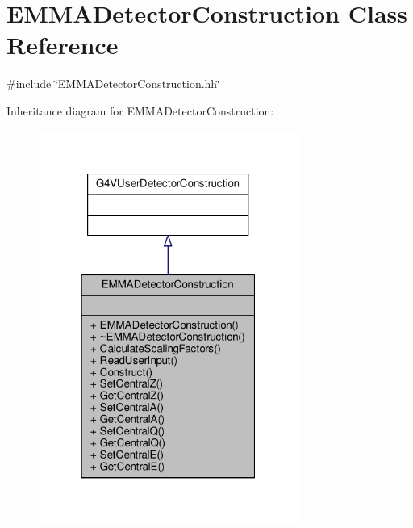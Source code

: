 \hypertarget{classEMMADetectorConstruction}{}\section{E\+M\+M\+A\+Detector\+Construction Class Reference}
\label{classEMMADetectorConstruction}


{\ttfamily \#include \char`\"{}E\+M\+M\+A\+Detector\+Construction.\+hh\char`\"{}}



Inheritance diagram for E\+M\+M\+A\+Detector\+Construction\+:
\nopagebreak
\begin{figure}[H]
\begin{center}
\leavevmode
\includegraphics[width=241pt]{classEMMADetectorConstruction__inherit__graph}
\end{center}
\end{figure}


